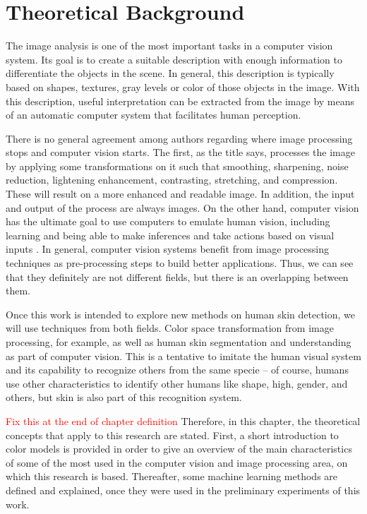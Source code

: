 \chapter{Theoretical Background}
\label{cap:conceitos}
The image analysis is one of the most important tasks in a computer vision system. Its goal is to create a suitable description with enough information to differentiate the objects in the scene. In general, this description is typically based on shapes, textures, gray levels or color of those objects in the image. With this description, useful interpretation can be extracted from the image by means of an automatic computer system that facilitates human perception.

There is no general agreement among authors regarding where image processing stops and computer vision starts. The first, as the title says, processes the image by applying some transformations on it such that smoothing, sharpening, noise reduction, lightening enhancement, contrasting, stretching, and compression. These will result on a more enhanced and readable image. In addition, the input and output of the process are always images. On the other hand, computer vision has the ultimate goal to use computers to emulate human vision, including learning and being able to make inferences and take actions based on visual inputs \citep{gonzalez:02}. In general, computer vision systems benefit from image processing techniques as pre-processing steps to build better applications. Thus, we can see that they definitely are not different fields, but there is an overlapping between them.

Once this work is intended to explore new methods on human skin detection, we will use techniques from both fields. Color space transformation from image processing, for example, as well as human skin segmentation and understanding as part of computer vision. This is a tentative to imitate the human visual system and its capability to recognize others from the same specie -- of course, humans use other characteristics to identify other humans like shape, high, gender, and others, but skin is also part of this recognition system.

\textcolor{red}{Fix this at the end of chapter definition} Therefore, in this chapter, the theoretical concepts that apply to this research are stated. First, a short introduction to color models is provided in order to give an overview of the main characteristics of some of the most used in the computer vision and image processing area, on which this research is based. Thereafter, some machine learning methods are defined and explained, once they were used in the preliminary experiments of this work.

